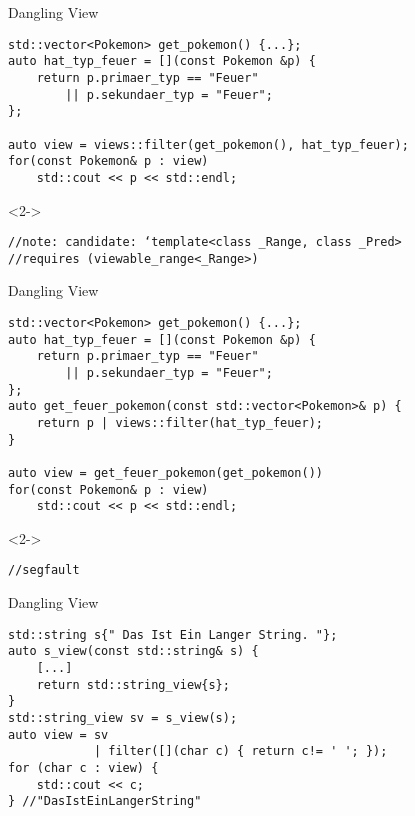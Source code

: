 \begin{frame}[fragile]{Dangling View}
    \begin{overlayarea}{\linewidth}{6cm}
        \begin{verbatim}
std::vector<Pokemon> get_pokemon() {...};
auto hat_typ_feuer = [](const Pokemon &p) { 
    return p.primaer_typ == "Feuer"
        || p.sekundaer_typ = "Feuer";
};

auto view = views::filter(get_pokemon(), hat_typ_feuer);
for(const Pokemon& p : view)
    std::cout << p << std::endl;
    \end{verbatim}
        \begin{onlyenv}<2->
            \begin{verbatim}
//note: candidate: ‘template<class _Range, class _Pred>
//requires (viewable_range<_Range>)
            \end{verbatim}
        \end{onlyenv}
    \end{overlayarea}
\end{frame}


\begin{frame}[fragile]{Dangling View}
    \begin{overlayarea}{\linewidth}{6cm}
        \begin{verbatim}
std::vector<Pokemon> get_pokemon() {...};
auto hat_typ_feuer = [](const Pokemon &p) {
    return p.primaer_typ == "Feuer"
        || p.sekundaer_typ = "Feuer";
};
auto get_feuer_pokemon(const std::vector<Pokemon>& p) {
    return p | views::filter(hat_typ_feuer);
}
    
auto view = get_feuer_pokemon(get_pokemon())
for(const Pokemon& p : view)
    std::cout << p << std::endl;
        \end{verbatim}
        \begin{onlyenv}<2->
            \begin{verbatim}
//segfault
            \end{verbatim}
        \end{onlyenv}
    \end{overlayarea}
\end{frame}


\begin{frame}[fragile]{Dangling View}
    \begin{verbatim}
std::string s{" Das Ist Ein Langer String. "};
auto s_view(const std::string& s) {
    [...]
    return std::string_view{s};
}
std::string_view sv = s_view(s);
auto view = sv
            | filter([](char c) { return c!= ' '; });
for (char c : view) {
    std::cout << c;
} //"DasIstEinLangerString"
    \end{verbatim}
\end{frame}

